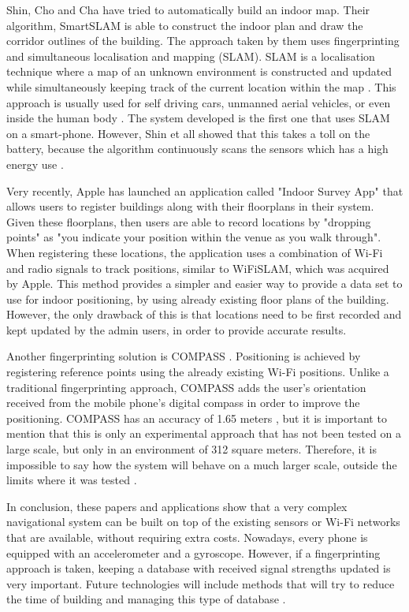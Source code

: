 Shin, Cho and Cha \cite{wifi-map} have tried to automatically build an indoor map. Their algorithm, SmartSLAM \cite{wifi-map} is able to construct the indoor plan and draw the corridor outlines of the building. The approach taken by them uses fingerprinting and simultaneous localisation and mapping (SLAM). SLAM is a localisation technique where a map of an unknown environment is constructed and updated while simultaneously keeping track of the current location within the map \cite{SLAM}. This approach is usually used for self driving cars, unmanned aerial vehicles, or even inside the human body \cite{SLAM-auto}. The system developed is the first one that uses SLAM on a smart-phone. However, Shin et all \cite{wifi-map} showed that this takes a toll on the battery, because the algorithm continuously scans the sensors which has a high energy use \cite{wifi-map}.

Very recently, Apple has launched an application called "Indoor Survey App" \cite{apple-indoor-survey} that allows users to register buildings along with their floorplans in their system. Given these floorplans, then users are able to record locations by "dropping points" as "you indicate your position within the venue as you walk through". When registering these locations, the application uses a combination of Wi-Fi and radio signals to track positions, similar to WiFiSLAM, which was acquired by Apple. This method provides a simpler and easier way to provide a data set to use for indoor positioning, by using already existing floor plans of the building. However, the only drawback of this is that locations need to be first recorded and kept updated by the admin users, in order to provide accurate results.

Another fingerprinting solution is COMPASS \cite{compass}. Positioning is achieved by registering reference points using the already existing Wi-Fi positions. Unlike a traditional fingerprinting approach, COMPASS adds the user's orientation received from the mobile phone's digital compass in order to improve the positioning. COMPASS has an accuracy of 1.65 meters \cite{compass}, but it is important to mention that this is only an experimental approach that has not been tested on a large scale, but only in an environment of 312 square meters. Therefore, it is impossible to say how the system will behave on a much larger scale, outside the limits where it was tested \cite{compass}.

In conclusion, these papers and applications show that a very complex navigational system can be built on top of the existing sensors or Wi-Fi networks that are available, without requiring extra costs. Nowadays, every phone is equipped with an accelerometer and a gyroscope. However, if a fingerprinting approach is taken, keeping a database with received signal strengths updated is very important. Future technologies will include methods that will try to reduce the time of building and managing this type of database \cite{wifi-explore-paper}.
